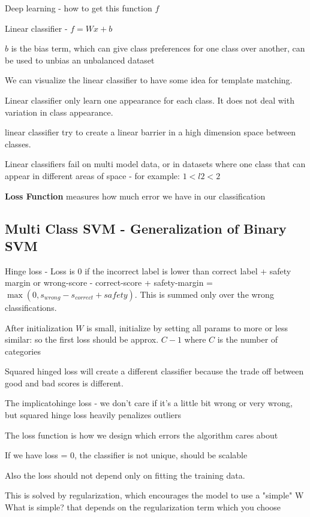 Deep learning - how to get this function $f$

Linear classifier - $f = Wx + b $

$b$ is the bias term, which can give class preferences for one class over another, can be used to unbias an unbalanced dataset

We can visualize the linear classifier to have some idea for template matching.

Linear classifier only learn one appearance for each class. It does not deal with variation in class appearance.

linear classifier try to create a linear barrier in a high dimension space between classes.

Linear classifiers fail on multi model data, or in datasets where one class that can appear in different areas of space - for example: $1 < l2 < 2$

\textbf{Loss Function} measures how much error we have in our classification

\subsection{Multi Class SVM - Generalization of Binary SVM}

Hinge loss - Loss is 0 if the incorrect label is lower than correct label + safety margin or wrong-score - correct-score + safety-margin = $\max(0, s_{wrong} - s_{correct} + safety)$. This is summed only over the wrong classifications. 

After initialization $W$ is small, initialize by setting all params to more or less similar: 
so the first loss should be approx. $C-1$ where $C$ is the number of categories

Squared hinged loss will create a different classifier because the trade off between good and bad scores is different. 

The implicatohinge loss - we don't care if it's a little bit wrong or very wrong, but squared hinge loss heavily penalizes outliers

The loss function is how we design which errors the algorithm cares about

If we have loss = 0, the classifier is not unique, should be scalable 

Also the loss should not depend only on fitting the training data.

This is solved by regularization, which encourages the model to use a "simple" W
What is simple? that depends on the regularization term which you choose

